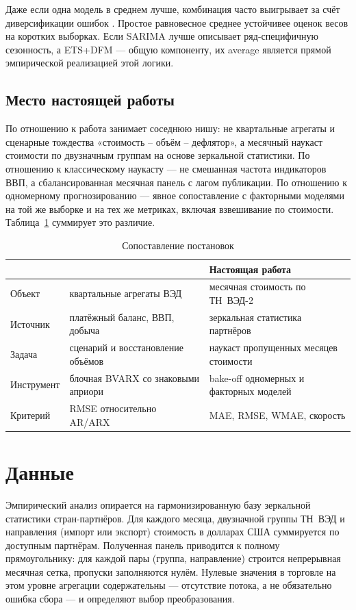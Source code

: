 \documentclass[12pt]{article}
\begin{document}
Даже если одна модель в среднем лучше, комбинация часто выигрывает за счёт диверсификации ошибок \citep{bates1969,clemen1989,timmermann2006}. Простое равновесное среднее устойчивее оценок весов на коротких выборках. Если SARIMA лучше описывает ряд-специфичную сезонность, а ETS+DFM --- общую компоненту, их average является прямой эмпирической реализацией этой логики.

\subsection{Место настоящей работы}

По отношению к \citet{slabolitskiy2026} работа занимает соседнюю нишу: не квартальные агрегаты и сценарные тождества «стоимость -- объём -- дефлятор», а месячный наукаст стоимости по двузначным группам на основе зеркальной статистики. По отношению к классическому наукасту --- не смешанная частота индикаторов ВВП, а сбалансированная месячная панель с лагом публикации. По отношению к одномерному прогнозированию --- явное сопоставление с факторными моделями на той же выборке и на тех же метриках, включая взвешивание по стоимости. Таблица~\ref{tab:place} суммирует это различие.

\begin{table}[htbp]
\centering
\caption{Сопоставление постановок}
\label{tab:place}
\small
\begin{tabular}{p{3.2cm}p{4.1cm}p{5.2cm}}
\toprule
 & \citet{slabolitskiy2026} & Настоящая работа \\
\midrule
Объект & квартальные агрегаты ВЭД & месячная стоимость по ТН~ВЭД-2 \\
Источник & платёжный баланс, ВВП, добыча & зеркальная статистика партнёров \\
Задача & сценарий и восстановление объёмов & наукаст пропущенных месяцев стоимости \\
Инструмент & блочная BVARX со знаковыми априори & bake-off одномерных и факторных моделей \\
Критерий & RMSE относительно AR/ARX & MAE, RMSE, WMAE, скорость \\
\bottomrule
\end{tabular}
\end{table}

\section{Данные}

Эмпирический анализ опирается на гармонизированную базу зеркальной статистики стран-партнёров. Для каждого месяца, двузначной группы ТН~ВЭД и направления (импорт или экспорт) стоимость в долларах США суммируется по доступным партнёрам. Полученная панель приводится к полному прямоугольнику: для каждой пары (группа, направление) строится непрерывная месячная сетка, пропуски заполняются нулём. Нулевые значения в торговле на этом уровне агрегации содержательны --- отсутствие потока, а не обязательно ошибка сбора --- и определяют выбор преобразования.
\end{document}
